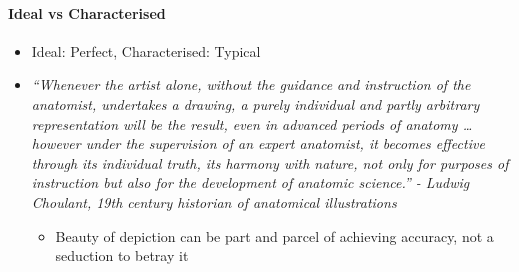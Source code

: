 \documentclass[a4paper]{article}
\begin{document}
\paragraph{Ideal vs Characterised}
\begin{itemize}
	\item Ideal: Perfect, Characterised: Typical
	\item \textit{``Whenever the artist alone, without the guidance and instruction of the anatomist, undertakes a drawing, a purely individual and partly arbitrary representation will be the result, even in advanced periods of anatomy … however under the supervision of an expert anatomist, it becomes effective through its individual truth, its harmony with nature, not only for purposes of instruction but also for the development of anatomic science.'' - Ludwig Choulant, 19th century historian of anatomical illustrations}
	\begin{itemize}[label=$\circ$]
		\item Beauty of depiction can be part and parcel of achieving accuracy, not a seduction to betray it
	\end{itemize}
\end{itemize}
\end{document}
